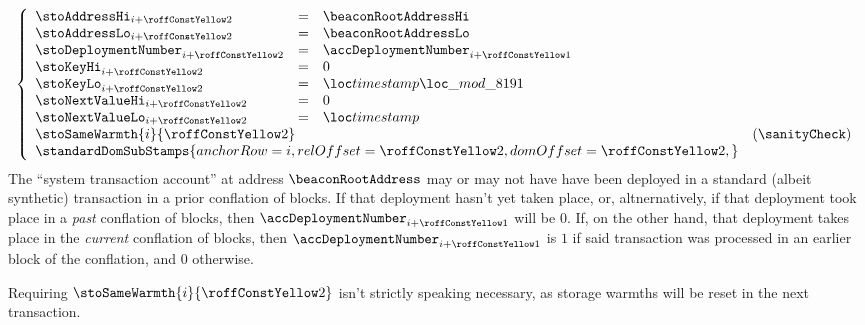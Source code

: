 \item[\underline{\underline{Storing the \inst{TIMESTAMP} in the state:}}]
	\[
		\left\{ \begin{array}{lclr}
			\stoAddressHi        _{i + \roffTxSkipSysiBeaconRootSystemContractStorageSetTimestamp} & = & \beaconRootAddressHi          \\
			\stoAddressLo        _{i + \roffTxSkipSysiBeaconRootSystemContractStorageSetTimestamp} & = & \beaconRootAddressLo          \\
			\stoDeploymentNumber _{i + \roffTxSkipSysiBeaconRootSystemContractStorageSetTimestamp} & = & \accDeploymentNumber          _{i + \roffTxSkipSysiBeaconRootSystemContractAccount} \\
			\stoKeyHi            _{i + \roffTxSkipSysiBeaconRootSystemContractStorageSetTimestamp} & = & 0                             \\
			\stoKeyLo            _{i + \roffTxSkipSysiBeaconRootSystemContractStorageSetTimestamp} & = & \locLineaTimestampModuloPrime \\
			\stoNextValueHi      _{i + \roffTxSkipSysiBeaconRootSystemContractStorageSetTimestamp} & = & 0                             \\
			\stoNextValueLo      _{i + \roffTxSkipSysiBeaconRootSystemContractStorageSetTimestamp} & = & \locLineaTimestamp            \\
			\multicolumn{3}{l}{\stoSameWarmth  {i}{\roffTxSkipSysiBeaconRootSystemContractStorageSetTimestamp} } & (\sanityCheck)      \\
			\multicolumn{3}{l}{
				\standardDomSubStamps {
					anchorRow = i                                                          ,
					relOffset = \roffTxSkipSysiBeaconRootSystemContractStorageSetTimestamp ,
					domOffset = \roffTxSkipSysiBeaconRootSystemContractStorageSetTimestamp ,
				}} \\
		\end{array} \right.
	\]
	\saNote{} \label{hub: tx skip: sysi: eip 4788: deployment number of system contract}
	The ``system transaction account'' at address $\beaconRootAddress$ may or may not have have been deployed
	in a standard (albeit synthetic) \user{} transaction in a prior conflation of blocks.
	If that deployment hasn't yet taken place, or, altnernatively,
	if that deployment took place in a \emph{past} conflation of blocks,
	then $\accDeploymentNumber _{i + \roffTxSkipSysiBeaconRootSystemContractAccount}$
	will be $0$.
	If, on the other hand, that deployment takes place in the \emph{current} conflation of blocks,
	then $\accDeploymentNumber _{i + \roffTxSkipSysiBeaconRootSystemContractAccount}$
	is $1$ if said transaction was processed in an earlier block of the conflation,
	and $0$ otherwise.

	\saNote{} \label{hub: tx skip: sysi: eip 4788: transaction processing: storage warmth constancy not strictly necessary}
	Requiring $\stoSameWarmth  {i}{\roffTxSkipSysiBeaconRootSystemContractStorageSetTimestamp} $ isn't
	strictly speaking necessary, as storage warmths will be reset in the next transaction.
